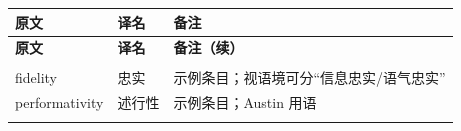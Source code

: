 \begingroup
\small
\renewcommand{\arraystretch}{1.28}
\begin{longtable}{@{}p{}p{}p{}@{}}
\toprule
\textbf{原文} & \textbf{译名} & \textbf{备注} \\
\midrule
\endfirsthead
\toprule
\textbf{原文} & \textbf{译名} & \textbf{备注（续）} \\
\midrule
\endhead
\bottomrule
\endlastfoot
\multicolumn{3}{@{}l}{\sffamily\bfseries 术语} \\[2pt]
fidelity & 忠实 & 示例条目；视语境可分“信息忠实/语气忠实” \\
performativity & 述行性 & 示例条目；Austin 用语 \\
\addlinespace[4pt]
\end{longtable}
\endgroup
